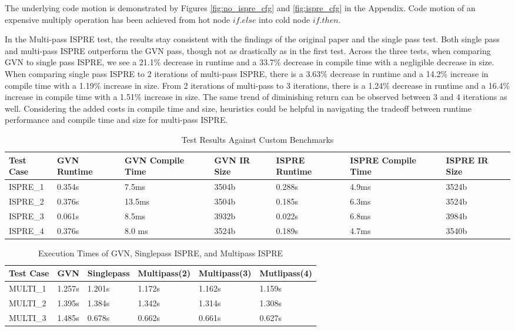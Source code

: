 \documentclass[sigplan,screen]{acmart}
\begin{document}
    The underlying code motion is demonstrated by Figures \ref{fig:no_ispre_cfg} and \ref{fig:ispre_cfg} in the Appendix. Code motion of an expensive multiply operation has been achieved from hot node $if.else$ into cold node $if.then$.

    In the Multi-pass ISPRE test, the results stay consistent with the findings of the original paper and the single pass test. Both single pass and multi-pass ISPRE outperform the GVN pass, though not as drastically as in the first test. Across the three tests, when comparing GVN to single pass ISPRE, we see a 21.1\% decrease in runtime and a 33.7\% decrease in compile time with a negligible decrease in size. When comparing single pass ISPRE to 2 iterations of multi-pass ISPRE, there is a 3.63\% decrease in runtime and a 14.2\% increase in compile time with a 1.19\% increase in size. From 2 iterations of multi-pass to 3 iterations, there is a 1.24\% decrease in runtime and a 16.4\% increase in compile time with a 1.51\% increase in size. The same trend of diminishing return can be observed between 3 and 4 iterations as well. Considering the added costs in compile time and size, heuristics could be helpful in navigating the tradeoff between runtime performance and compile time and size for multi-pass ISPRE. 
    
    \clearpage
    \begin{table}[!t]
	\begin{tabular}{|l|l|l|l|l|l|l|}
	\hline
	Test Case & GVN Runtime  & GVN Compile Time & GVN IR Size & ISPRE Runtime & ISPRE Compile Time & ISPRE IR Size \\ \hline \hline
	ISPRE\_1  & 0.354s & 7.5ms & 3504b & 0.288s & 4.9ms & 3524b \\ \hline
	ISPRE\_2  & 0.376s & 13.5ms & 3504b & 0.185s & 6.3ms & 3524b \\ \hline
	ISPRE\_3  & 0.061s & 8.5ms & 3932b & 0.022s & 6.8ms & 3984b \\ \hline
	ISPRE\_4  & 0.376s & 8.0 ms & 3524b & 0.189s & 4.7ms & 3540b \\ \hline
	\end{tabular}
	\caption{Test Results Against Custom Benchmarks}
	\label{tab:resultssingle}
	\end{table}

        \begin{table}[t!]
	\begin{tabular}{|l|l|l|l|l|l|}
	\hline
	Test Case & GVN  & Singlepass & Multipass(2) & Multipass(3) & Mutlipass(4)\\ \hline \hline
	MULTI\_1  & 1.257s & 1.201s & 1.172s & 1.162s & 1.159s \\ \hline
	MULTI\_2  & 1.395s & 1.384s & 1.342s & 1.314s & 1.308s \\ \hline
	MULTI\_3  & 1.485s & 0.678s & 0.662s & 0.661s & 0.627s \\ \hline
	\end{tabular}
	\caption{Execution Times of GVN, Singlepass ISPRE, and Multipass ISPRE}
	\label{tab:resultmultiruntime}
	\end{table}
\end{document}
